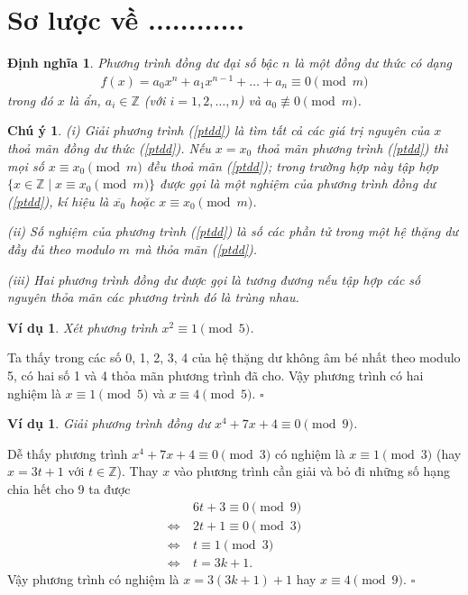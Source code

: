 \documentclass[12pt,a4paper,openany,oneside]{report}
\newtheorem{dn}[dl]{Định nghĩa}
\newtheorem{cy}[dl]{Chú ý}
\newtheorem{vd}[dl]{Ví dụ}
\def\Z{\mathbb{Z}}
\newenvironment{giai}{\noindent{\em \textit{Giải}. }}{\hfill $\square$}
\begin{document}
\section{Sơ lược về ............ }
\begin{dn}\rm {\it Phương trình đồng dư đại số bậc $n$} là một đồng dư thức có dạng
\begin{align} \label{ptdd}
f(x)= a_0x^n + a_1x^{n-1} + \ldots + a_n \equiv 0\pmod{m}
\end{align}
trong đó $x$ là ẩn, $a_i \in \mathbb{Z}$ (với $i = 1, 2, \ldots, n$) và $a_0\not\equiv 0\pmod m$.
\end{dn} 
\begin{cy}\rm (i) Giải phương trình (\ref{ptdd}) là tìm tất cả các giá trị nguyên của $x$ thoả mãn đồng dư thức (\ref{ptdd}). Nếu $x = x_0$ thoả mãn phương trình (\ref{ptdd}) thì mọi số $x \equiv x_0\pmod{m}$ đều thoả mãn (\ref{ptdd}); trong trường hợp này tập hợp $\{x\in\Z\mid x\equiv x_0\pmod m\}$ được gọi là một {\it nghiệm} của phương trình đồng dư (\ref{ptdd}), kí hiệu là $\overline{x_0}$ hoặc $x\equiv x_0\pmod m$.\par
\item (ii) Số nghiệm của phương trình (\ref{ptdd}) là số các phần tử trong một hệ thặng dư đầy đủ theo modulo $m$ mà thỏa mãn (\ref{ptdd}).\par
\item (iii) Hai phương trình đồng dư được gọi là tương đương nếu tập hợp các số nguyên thỏa mãn các phương trình đó là trùng nhau.
\end{cy}

\begin{vd} \rm Xét phương trình $x^2 \equiv 1 \pmod{5}$.
\end{vd}

\begin{giai} Ta thấy trong các số 0, 1, 2, 3, 4 của hệ thặng dư không âm bé nhất theo modulo 5, có hai số 1 và 4 thỏa mãn phương trình đã cho. Vậy phương trình có hai nghiệm là $x \equiv 1 \pmod{5}$ và $x \equiv 4 \pmod{5}$.
\end{giai}

\begin{vd} \rm Giải phương trình đồng dư $x^4 + 7x + 4 \equiv 0\pmod{9}$.
\end{vd}
\begin{giai} Dễ thấy phương trình $x^4 + 7x + 4 \equiv 0\pmod{3}$ có nghiệm là $x \equiv 1\pmod{3}$ (hay $x = 3t +1$ với $t\in\Z$). Thay $x$ vào phương trình cần giải và bỏ đi những số hạng chia hết cho 9 ta được
	\begin{align*}
	&6t + 3  \equiv 0\pmod{9}\\
	\Leftrightarrow \ & 2t + 1  \equiv 0\pmod{3}\\
	\Leftrightarrow \ & t \equiv 1\pmod{3}\\
		\Leftrightarrow \ & t = 3k +1.
	\end{align*}
Vậy phương trình có nghiệm là $x = 3(3k+1) + 1$ hay $x \equiv 4\pmod{9}$.
\end{giai}
\end{document}
